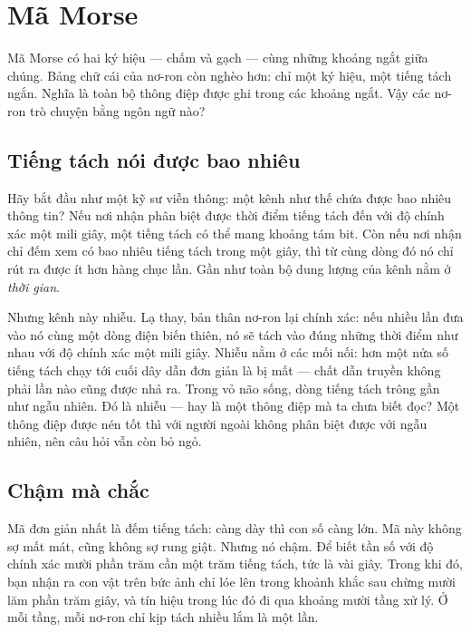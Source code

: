 \chapter{Mã Morse}

Mã Morse có hai ký hiệu --- chấm và gạch --- cùng những khoảng ngắt giữa chúng. Bảng chữ cái của nơ-ron còn nghèo hơn: chỉ một ký hiệu, một tiếng tách ngắn. Nghĩa là toàn bộ thông điệp được ghi trong các khoảng ngắt. Vậy các nơ-ron trò chuyện bằng ngôn ngữ nào?

\section*{Tiếng tách nói được bao nhiêu}

Hãy bắt đầu như một kỹ sư viễn thông: một kênh như thế chứa được bao nhiêu thông tin? Nếu nơi nhận phân biệt được thời điểm tiếng tách đến với độ chính xác một mili giây, một tiếng tách có thể mang khoảng tám bit. Còn nếu nơi nhận chỉ đếm xem có bao nhiêu tiếng tách trong một giây, thì từ cùng dòng đó nó chỉ rút ra được ít hơn hàng chục lần. Gần như toàn bộ dung lượng của kênh nằm ở \emph{thời gian}.


Nhưng kênh này nhiễu. Lạ thay, bản thân nơ-ron lại chính xác: nếu nhiều lần đưa vào nó cùng một dòng điện biến thiên, nó sẽ tách vào đúng những thời điểm như nhau với độ chính xác một mili giây. Nhiễu nằm ở các mối nối: hơn một nửa số tiếng tách chạy tới cuối dây dẫn đơn giản là bị mất --- chất dẫn truyền không phải lần nào cũng được nhả ra. Trong vỏ não sống, dòng tiếng tách trông gần như ngẫu nhiên. Đó là nhiễu --- hay là một thông điệp mà ta chưa biết đọc? Một thông điệp được nén tốt thì với người ngoài không phân biệt được với ngẫu nhiên, nên câu hỏi vẫn còn bỏ ngỏ.

\section*{Chậm mà chắc}

Mã đơn giản nhất là đếm tiếng tách: càng dày thì con số càng lớn. Mã này không sợ mất mát, cũng không sợ rung giật. Nhưng nó chậm. Để biết tần số với độ chính xác mười phần trăm cần một trăm tiếng tách, tức là vài giây. Trong khi đó, bạn nhận ra con vật trên bức ảnh chỉ lóe lên trong khoảnh khắc sau chừng mười lăm phần trăm giây, và tín hiệu trong lúc đó đi qua khoảng mười tầng xử lý. Ở mỗi tầng, mỗi nơ-ron chỉ kịp tách nhiều lắm là một lần.

